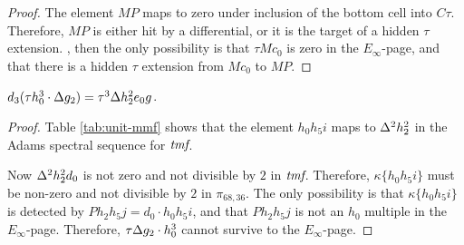\begin{proof}
The element $M P$ maps to zero under inclusion of the bottom cell into 
$C \tau$. 
Therefore,
$M P$ is either hit by a differential, or it is the target of a 
hidden $\tau$ extension.  
,
then the only possibility is that $\tau M c_0$ is zero in the
$E_\infty$-page, and that there is a hidden
$\tau$ extension from $M c_0$ to $M P$.

\end{proof}

\begin{lemma}
\label{lem:d3-tDg2.h0^3}
$d_3(\tau h_0^3 \cdot \Delta g_2) = \tau^3 \Delta h_2^2 e_0 g$.
\end{lemma}

\begin{proof}
Table \ref{tab:unit-mmf} shows that the element
$h_0 h_5 i$ maps to $\Delta^2 h_2^2$ in
the Adams spectral sequence for $\textit{tmf}$.

Now $\Delta^2 h_2^2 d_0$ is not zero and not divisible by $2$ in $\textit{tmf}$.
Therefore, $\kappa \{ h_0 h_5 i\}$ must be non-zero and 
not divisible by $2$ in $\pi_{68,36}$.
The only possibility is that
$\kappa \{h_0 h_5 i\}$ is detected by 
$P h_2 h_5 j = d_0 \cdot h_0 h_5 i$, and that
$P h_2 h_5 j$ is not an $h_0$ multiple in the $E_\infty$-page.
Therefore, $\tau \Delta g_2 \cdot h_0^3$ cannot survive to the
$E_\infty$-page.
\end{proof}


